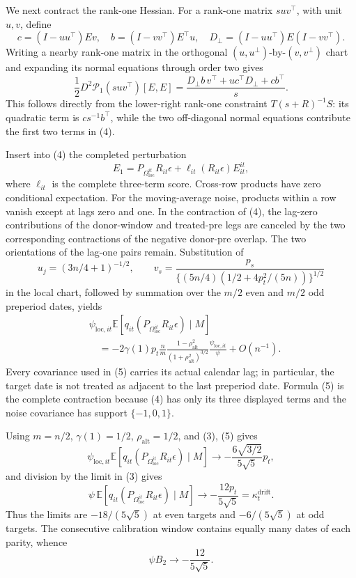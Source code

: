 We next contract the rank-one Hessian.  For a rank-one matrix \(suv^{\top}\), with unit \(u,v\), define
\[
 c=(I-uu^{\top})Ev,
 \quad b=(I-vv^{\top})E^{\top}u,
 \quad D_\perp=(I-uu^{\top})E(I-vv^{\top}).
\]
Writing a nearby rank-one matrix in the orthogonal \((u,u^\perp)\)-by-\((v,v^\perp)\) chart and expanding its normal equations through order two gives
\[
 \frac12D^2\mathcal P_1(suv^{\top})[E,E]
 =\frac{D_\perp b\,v^{\top}+uc^{\top}D_\perp+cb^{\top}}s.
 \tag{4}
\]
This follows directly from the lower-right rank-one constraint
\(T(s+R)^{-1}S\): its quadratic term is \(cs^{-1}b^{\top}\), while the two off-diagonal normal equations contribute the first two terms in (4).

Insert into (4) the completed perturbation
\[
 E_1=P_{\Omega_{\mathrm{loc}}^{it}}R_{it}\epsilon
 +\ell_{it}(R_{it}\epsilon)E^{it}_{it},
\]
where \(\ell_{it}\) is the complete three-term score.  Cross-row products have zero conditional expectation.  For the moving-average noise, products within a row vanish except at lags zero and one.  In the contraction of (4), the lag-zero contributions of the donor-window and treated-pre legs are canceled by the two corresponding contractions of the negative donor-pre overlap.  The two orientations of the lag-one pairs remain.  Substitution of
\[
 u_j=(3n/4+1)^{-1/2},
 \qquad
 v_s=\frac{p_s}{\{(5n/4)(1/2+4p_t^2/(5n))\}^{1/2}}
\]
in the local chart, followed by summation over the \(m/2\) even and \(m/2\) odd preperiod dates, yields
\[
 \begin{aligned}
 &\psi_{\mathrm{loc},it}
 \mathbb E\!\left[q_{it}(P_{\Omega_{\mathrm{loc}}^{it}}R_{it}\epsilon)\mid M\right]\\
 &\quad=-2\gamma(1)p_t\frac nm
 \frac{1-\rho_{\mathrm{alt}}^2}{(1+\rho_{\mathrm{alt}}^2)^{3/2}}
 \frac{\psi_{\mathrm{loc},it}}\psi+O(n^{-1}).
 \end{aligned}
 \tag{5}
\]
Every covariance used in (5) carries its actual calendar lag; in particular, the target date is not treated as adjacent to the last preperiod date.  Formula (5) is the complete contraction because (4) has only its three displayed terms and the noise covariance has support \(\{-1,0,1\}\).

Using \(m=n/2\), \(\gamma(1)=1/2\), \(\rho_{\mathrm{alt}}=1/2\), and (3), (5) gives
\[
 \psi_{\mathrm{loc},it}
 \mathbb E[q_{it}(P_{\Omega_{\mathrm{loc}}^{it}}R_{it}\epsilon)\mid M]
 \longrightarrow-\frac{6\sqrt{3/2}}{5\sqrt5}p_t,
 \tag{6}
\]
and division by the limit in (3) gives
\[
 \psi\,\mathbb E[q_{it}(P_{\Omega_{\mathrm{loc}}^{it}}R_{it}\epsilon)\mid M]
 \longrightarrow-\frac{12p_t}{5\sqrt5}=\kappa_t^{\mathrm{drift}}.
 \tag{7}
\]
Thus the limits are \(-18/(5\sqrt5)\) at even targets and \(-6/(5\sqrt5)\) at odd targets.  The consecutive calibration window contains equally many dates of each parity, whence
\[
 \psi B_2\longrightarrow-\frac{12}{5\sqrt5}.
 \tag{8}
\]

